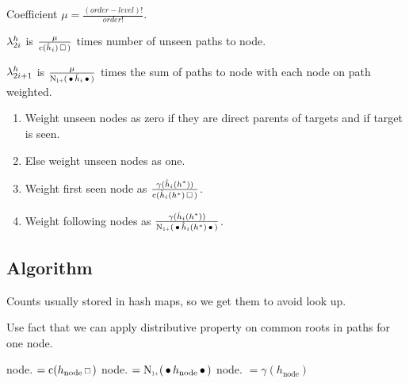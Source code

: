 \begin{draft}
Coefficient $\mu = \frac{(order - level)!}{order!}$.
\end{draft}

\begin{draft}
$\lambda_{2 i}^h$ is $\frac{\mu}{\Count(\DerivedHistory[i]) \Skp)}$ times number
of unseen paths to node.

$\lambda_{2 i + 1}^h$ is
$\frac{\mu}{\ContCountIp(\WSkp \DerivedHistory[i] \WSkp)}$ times the sum of paths to
node with each node on path weighted.
\begin{enumerate}
  \item Weight unseen nodes as zero if they are direct parents of targets and if
    target is seen.
  \item Else weight unseen nodes as one.
  \item Weight first seen node as $\frac{\gamma(\DerivedHistory[i](h^*))}{\Count(\DerivedHistory[i](h^*) \Skp)}$.
  \item Weight following nodes as $\frac{\gamma(\DerivedHistory[i](h^*))}{\ContCountIp(\WSkp \DerivedHistory[i](h^*) \WSkp)}$.
\end{enumerate}
\end{draft}



\subsection{Algorithm}

\begin{draft}
Counts usually stored in hash maps, so we get them to avoid look up.

Use fact that we can apply distributive property on common roots in paths for
one node.
\end{draft}

\begin{algorithmic}[1]
  \State node. $= \Count(h_\text{node} \Skp)$
  \State node. $= \ContCountIp(\WSkp h_\text{node} \WSkp)$
  \State node. $= \gamma(h_\text{node})$
\end{algorithmic}


